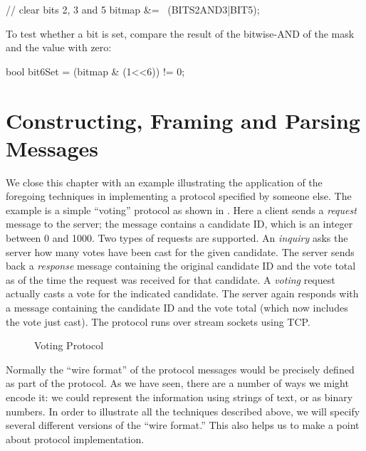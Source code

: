 \begin{inlinecode}
// clear bits 2, 3 and 5
bitmap &= ~(BITS2AND3|BIT5);
\end{inlinecode}

\noindent To test whether a bit is set, compare the result of the
bitwise-AND of the mask and the value with zero:

\begin{inlinecode}
bool bit6Set = (bitmap & (1<<6)) != 0;
\end{inlinecode}

\section{Constructing, Framing and Parsing Messages}
\label{sect:parsing}%

We close this chapter with an example illustrating the
application of the foregoing techniques in implementing
a protocol specified by someone else.
The example is a simple ``voting'' protocol as shown in
.  Here a client sends a \emph{request\/} message
to the server; 
the message contains a candidate ID, which is an integer between 0 and
1000.  Two types of requests are supported. An \emph{inquiry\/} asks
the server how many votes have been cast for the given candidate.  The
server sends back a \emph{response\/} message containing the original candidate
ID and the vote total as of the time the request was received for
that candidate.  A \emph{voting\/} request actually casts a vote for
the indicated candidate.  The server again responds with a message
containing the candidate ID and the vote total (which now includes the
vote just cast).
The protocol runs over stream sockets using TCP.

\begin{figure}[htbp]
\begin{center}
\caption{Voting Protocol\label{fig:VoteProto}}
\end{center}
\end{figure}


Normally the ``wire format'' of the protocol
messages would be precisely defined as part of the protocol.
As we have seen, there are a number of ways we might encode it: we could
represent the information using strings of text, or as binary numbers.
In order to illustrate all the techniques described above, we will
specify several different versions of the ``wire format.''  This also
helps us to make a point about protocol implementation.

